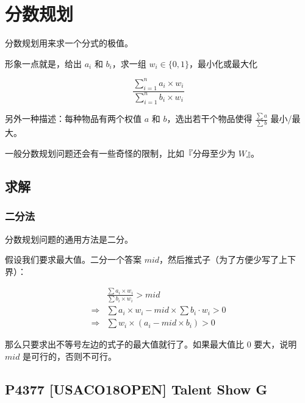 \section{分数规划}
分数规划用来求一个分式的极值。

形象一点就是，给出 \(a_i\) 和 \(b_i\)，求一组 \(w_i\in\{0,1\}\)，最小化或最大化

\[
\displaystyle\frac{\sum\limits_{i=1}^na_i\times w_i}{\sum\limits_{i=1}^nb_i\times w_i}
\]

另外一种描述：每种物品有两个权值 \(a\) 和 \(b\)，选出若干个物品使得 \(\displaystyle\frac{\sum a}{\sum b}\) 最小/最大。

一般分数规划问题还会有一些奇怪的限制，比如『分母至少为 \(W\)』。

\subsection{求解}\label{ux6c42ux89e3}

\subsubsection{二分法}\label{ux4e8cux5206ux6cd5}

分数规划问题的通用方法是二分。

假设我们要求最大值。二分一个答案 \(mid\)，然后推式子（为了方便少写了上下界）：

\[
\displaystyle
\begin{aligned}
&\frac{\sum a_i\times w_i}{\sum b_i\times w_i}>mid\\
\Longrightarrow&\sum a_i\times w_i-mid\times \sum b_i\cdot w_i>0\\
\Longrightarrow&\sum w_i\times(a_i-mid\times b_i)>0
\end{aligned}
\]

那么只要求出不等号左边的式子的最大值就行了。如果最大值比 \(0\) 要大，说明 \(mid\) 是可行的，否则不可行。

\subsection{P4377 {[}USACO18OPEN{]} Talent Show G}\label{p4377-usaco18open-talent-show-g}






